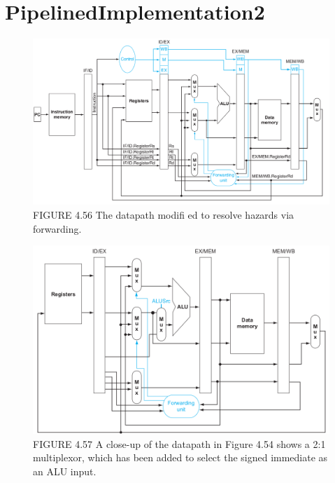 \documentclass{article}
\begin{document}
\section*{PipelinedImplementation2}
\begin{figure}[H]
    \begin{center}
        \includegraphics[scale=0.4]{PipelinedImplementation2/PipelinedVersion_Forwarding.png}
        \caption*{FIGURE 4.56 The datapath modifi ed to resolve hazards via forwarding.}
    \end{center}
\end{figure}
\begin{figure}[H]
    \begin{center}
        \includegraphics[scale=0.5]{PipelinedImplementation2/PipelinedVerson_Forward2.png}
        \caption*{FIGURE 4.57 A close-up of the datapath in Figure 4.54 shows a 2:1 multiplexor, which has been added to select the signed immediate as an ALU input.}
    \end{center}
\end{figure}
\end{document}
